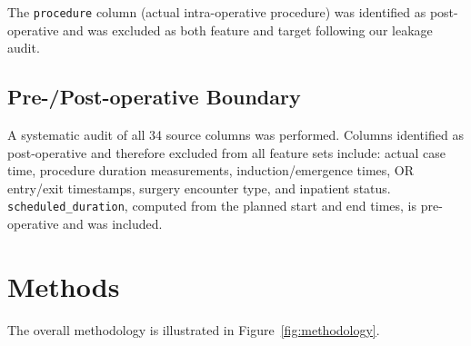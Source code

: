 \documentclass[10pt,twocolumn]{article}
\begin{document}
The \texttt{procedure} column (actual intra-operative procedure) was identified as post-operative and was excluded as both feature and target following our leakage audit.

\subsection{Pre-/Post-operative Boundary}
A systematic audit of all 34 source columns was performed. Columns identified as post-operative and therefore excluded from all feature sets include: actual case time, procedure duration measurements, induction/emergence times, OR entry/exit timestamps, surgery encounter type, and inpatient status. \texttt{scheduled\_duration}, computed from the planned start and end times, is pre-operative and was included.

\section{Methods}
\label{sec:methods}

The overall methodology is illustrated in Figure~\ref{fig:methodology}.

\end{document}
